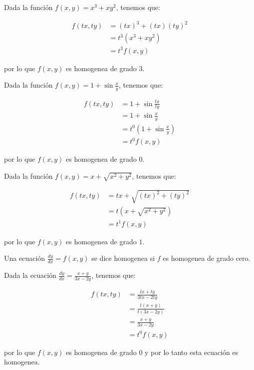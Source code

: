 		\begin{ejemplo}
			Dada la función $f(x, y) = x^3 + x y^2$, tenemos que:

			\begin{align*}
				f(tx, ty) &= (tx)^3 + (tx) (ty)^2 \\
				&= t^3 (x^3 + xy^2) \\
				&= t^3 f(x, y)
			\end{align*}

			por lo que $f(x, y)$ es homogenea de grado $3$.
		\end{ejemplo}

		\begin{ejemplo}
			Dada la función $f(x, y) = 1 + \sin{\frac{x}{y}}$, tenemos que:

			\begin{align*}
				f(tx, ty) &= 1 + \sin{\frac{tx}{ty}} \\
				&= 1 + \sin{\frac{x}{y}} \\
				&= t^0 (1 + \sin{\frac{x}{y}}) \\
				&= t^0 f(x, y)
			\end{align*}

			por lo que $f(x, y)$ es homogenea de grado $0$.
		\end{ejemplo}

		\begin{ejemplo}
			Dada la función $f(x, y) = x + \sqrt{x^2 + y^2}$, tenemos que:

			\begin{align*}
				f(tx, ty) &= tx + \sqrt{(tx)^2 + (ty)^2} \\
				&= t (x + \sqrt{x^2 + y^2}) \\
				&= t^1 f(x, y)
			\end{align*}

			por lo que $f(x, y)$ es homogenea de grado $1$.
		\end{ejemplo}

		\begin{definicion}
			Una ecuación $\frac{dy}{dx} = f(x, y)$ se dice homogenea si $f$ es homogenea de grado cero.
		\end{definicion}

		\begin{ejemplo}
			Dada la ecuación $\frac{dy}{dx} = \frac{x + y}{3x - 2y}$, tenemos que:

			\begin{align*}
				f(tx, ty) &= \frac{tx + ty}{3tx - 2ty} \\
				&= \frac{t(x + y)}{t (3x - 2y)} \\
				&= \frac{x + y}{3x - 2y} \\
				&= t^0 f(x, y)
			\end{align*}

			por lo que $f(x, y)$ es homogenea de grado $0$ y por lo tanto esta ecuación es homogenea.
		\end{ejemplo}

